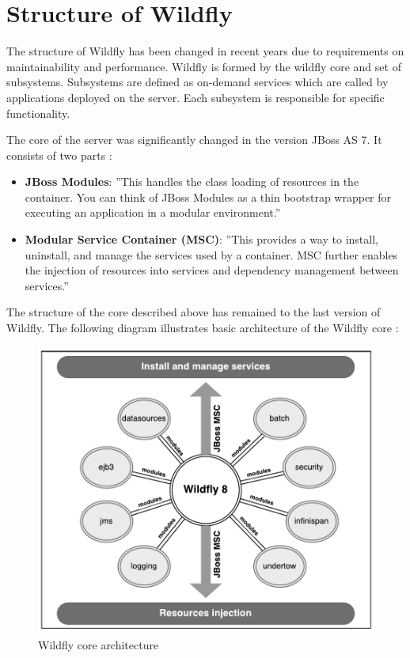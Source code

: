 \documentclass[12pt,oneside]{fithesis2}
\begin{document}
\section{Structure of Wildfly}
The structure of Wildfly has been changed in recent years due to requirements on maintainability and performance. Wildfly is formed by the wildfly core and set of subsystems. Subsystems are defined as on-demand services which are called by applications deployed on the server. Each subsystem is responsible for specific functionality.

The core of the server was significantly changed in the version JBoss AS 7. It consists of two parts \cite{jboss_as_book}:

\begin{itemize}
	\item \textbf{JBoss Modules}: ''This handles the class loading of resources in the container.
	You can think of JBoss Modules as a thin bootstrap wrapper for executing
	an application in a modular environment.''
	\item \textbf{Modular Service Container (MSC)}: ''This provides a way to install,
	uninstall, and manage the services used by a container. MSC further
	enables the injection of resources into services and dependency
	management between services.''
\end{itemize}

The structure of the core described above has remained to the last version of Wildfly. The following diagram illustrates basic architecture of the Wildfly core \cite{wildfly_book}:

\begin{figure}[ht!]
	\centering
	\includegraphics[width=\textwidth]{images/wildfly_core}
	\caption{Wildfly core architecture}
	\label{wildfly_core}
\end{figure}
\end{document}

